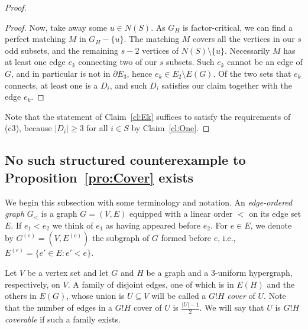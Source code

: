 \documentclass[10pt,a4paper]{amsart}
\begin{document}
\begin{proof}
\begin{proof}
Now, take away some $u \in N(S)$. As $G_H$ is factor-critical, we can find a perfect matching $M$ in $G_H - \{u\}$. The matching $M$ covers all the vertices in our $s$ odd subsets, and the remaining $s-2$ vertices of $N(S) \setminus \{u\}$. Necessarily $M$ has at least one edge $e_k$ connecting two of our $s$ subsets. Such $e_k$ cannot be an edge of $G$, and in particular is not in $\partial E_3$, hence $e_k \in E_2 \setminus E(G)$. Of the two sets that $e_k$ connects, at least one is a $D_i$, and such $D_i$ satisfies our claim together with the edge $e_k$.
\end{proof}

Note that the statement of Claim~\ref{cl:Ek} suffices to satisfy the requirements of (c3), because $|D_i| \ge 3$ for all $i \in S$ by Claim~\ref{cl:One}.
\end{proof}

\subsection{No such structured counterexample to Proposition~\ref{pro:Cover} exists}
We begin this subsection with some terminology and notation. An \emph{edge-ordered graph} $G_<$ is a graph $G = (V, E)$ equipped with a linear order $<$ on its edge set $E$. If $e_1 < e_2$ we think of $e_1$ as having appeared before $e_2$. For $e \in E$, we denote by $G^{(e)} = (V, E^{(e)})$ the subgraph of $G$ formed before $e$, i.e., $E^{(e)} = \{ e' \in E: e' < e\}$.

Let $V$ be a vertex set and let $G$ and $H$ be a graph and a $3$-uniform hypergraph, respectively, on $V$. A family of disjoint edges, one of which is in $E(H)$ and the others in $E(G)$, whose union is $U \subseteq V$ will be called a $G!H$ \emph{cover} of $U$. Note that the number of edges in a $G!H$ cover of $U$ is $\frac{|U|-1}{2}$. We will say that $U$ is $G!H$ \emph{coverable} if such a family exists.
\end{document}
